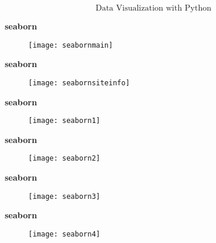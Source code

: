 


 
  
  \huge
  \[ \mbox{Data Visualization with Python} \]
  
 
 
  
 \textbf{seaborn}
 
 \begin{figure}
  \centering
  \texttt{[image: seabornmain]}
  
 \end{figure}
 
 
  
 \textbf{seaborn}
 
 \begin{figure}
  \centering
  \texttt{[image: seabornsiteinfo]}
  
 \end{figure}
 
 
  
 \textbf{seaborn}
 
 \begin{figure}
  \centering
  \texttt{[image: seaborn1]}
  
 \end{figure}
 

 
   
  \textbf{seaborn}
  
 \begin{figure}
  \centering
  \texttt{[image: seaborn2]}
 \end{figure}
 

 
   
  \textbf{seaborn}
  
 \begin{figure}
  \centering
  \texttt{[image: seaborn3]}  
 \end{figure}
 

 
   
  \textbf{seaborn}
  
 \begin{figure}
  \centering
  \texttt{[image: seaborn4]}
  
 \end{figure}
 

 

